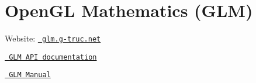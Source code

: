 \chapter{Open\+GL Mathematics (GLM)}
\hypertarget{index}{}\label{index}

\begin{DoxyItemize}
\item Website\+: \href{https://glm.g-truc.net}{\texttt{ glm.\+g-\/truc.\+net}}
\item \href{modules.html}{\texttt{ GLM API documentation}}
\item \href{https://github.com/g-truc/glm/blob/master/manual.md}{\texttt{ GLM Manual}} 
\end{DoxyItemize}